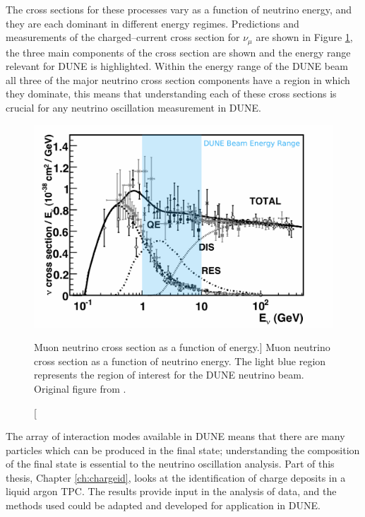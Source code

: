 \bigskip
\noindent
The cross sections for these processes vary as a function of neutrino energy,
and they are each dominant in different energy regimes. Predictions and 
measurements of the charged--current cross section for $\nu_\mu$ are shown in 
Figure \ref{fig:numu_xsec}, the three main components of the cross section are 
shown and the energy range relevant for DUNE is 
highlighted\cite{Formaggio:2013kya}. Within the energy range of the DUNE beam 
all three of the major neutrino cross section components have a region in 
which they dominate, this means that understanding each of these cross 
sections is crucial for any neutrino oscillation measurement in DUNE. 

\begin{figure}
	\centering
	\includegraphics[width=\textwidth]{figures/numu_xsec.pdf}
	\caption
	[Muon neutrino cross section as a function of energy.]
	{Muon neutrino cross section as a function of neutrino energy. The light blue
	region represents the region of interest for the DUNE neutrino beam. Original 
	figure from \cite{Formaggio:2013kya}.}
	\label{fig:numu_xsec}
\end{figure}

The array of interaction modes available in DUNE means that there are many
particles which can be produced in the final state; understanding 
the composition of the final state is essential to the neutrino oscillation 
analysis. Part of this thesis, Chapter \ref{ch:chargeid}, looks at
the identification of charge deposits in a liquid argon TPC. The results 
provide input in the analysis of \protodune{} data, and the methods used could 
be adapted and developed for application in DUNE. 

